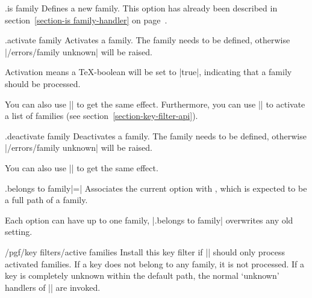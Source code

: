 \begin{handler}{{.is family}}
    Defines a new family. This option has already been described in
    section~\ref{section-is family-handler} on page~\pageref{section-is
    family-handler}.
\end{handler}

\begin{handler}{{.activate family}}
    Activates a family. The family needs to be defined, otherwise
    |/errors/family unknown| will be raised.

    Activation means a \TeX-boolean will be set to |true|, indicating that a
    family should be processed.

    You can also use |\pgfkeysactivatefamily| to get the same
    effect. Furthermore, you can use |\pgfkeysactivatefamilies| to activate a list of families
    (see section~\ref{section-key-filter-api}).
\end{handler}

\begin{handler}{{.deactivate family}}
    Deactivates a family. The family needs to be defined, otherwise
    |/errors/family unknown| will be raised.

    You can also use |\pgfkeysdeactivatefamily| to get the same
    effect.
\end{handler}

\begin{handler}{{.belongs to family}|=|}
    Associates the current option with , which is expected to
    be a full path of a family.
\begin{codeexample}
\end{codeexample}
    Each option can have up to one family, |.belongs to family| overwrites any
    old setting.
\end{handler}

\begin{key}{/pgf/key filters/active families}
    Install this key filter if |\pgfkeysfiltered| should only process activated
    families. If a key does not belong to any family, it is not processed. If a
    key is completely unknown within the default path, the normal `unknown'
    handlers of |\pgfkeys| are invoked.
\end{key}

